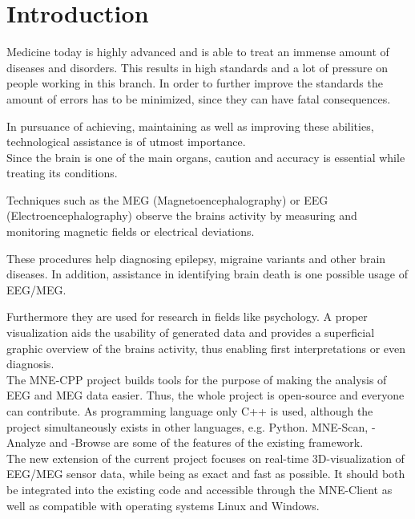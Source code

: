 
\section{Introduction}

	Medicine today is highly advanced and is able to treat an immense amount of diseases and disorders.
	This results in high standards and a lot of pressure on people working in this branch. In order to further improve the 			standards the amount of errors has to be minimized, since they can have fatal consequences.

	In pursuance of achieving, maintaining as well as improving these abilities, technological assistance is of utmost 				importance.\\  

	Since the brain is one of the main organs, caution and accuracy is essential while treating its conditions. 
	
	Techniques such as the MEG (Magnetoencephalography) or EEG (Electroencephalography) observe the brains activity by 				measuring and monitoring magnetic fields or electrical deviations.

	These procedures help diagnosing epilepsy, migraine variants and other brain diseases. In addition, assistance in 				identifying brain death is one possible usage of EEG/MEG.
	 
	Furthermore they are used for research in fields like psychology.
	A proper visualization aids the usability of generated data and provides a superficial graphic overview of the brains 			activity, thus enabling first interpretations or even diagnosis.\\
	

	The MNE-CPP  project builds tools for the purpose of making the analysis of EEG and MEG data easier.
	Thus, the whole project is open-source and everyone can contribute. As programming language only C++ is used, although the project 			simultaneously exists in other languages, e.g. Python. 
	MNE-Scan, -Analyze and -Browse are some of the features of the existing framework. \\

	The new extension of the current project focuses on real-time 3D-visualization of EEG/MEG sensor data, while being as 		exact and fast as possible. It should both be integrated into the existing code and accessible through the MNE-Client as well as 			compatible with operating systems Linux and Windows.
  
